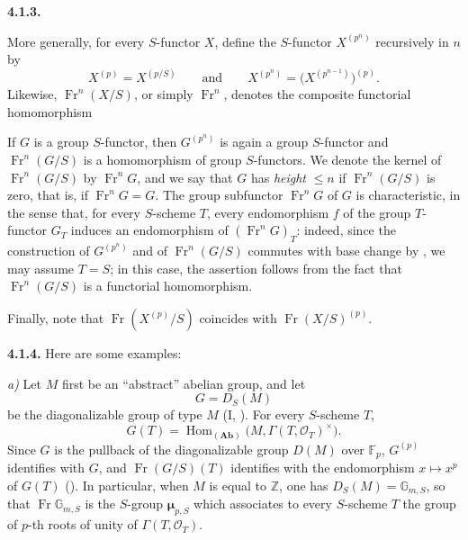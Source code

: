 
\medskip
\noindent\textbf{4.1.3.}
\label{sga3:VIIA:4.1.3}

More generally, for every \(S\)-functor \(X\), define the
\(S\)-functor \(X^{(p^n)}\) recursively in \(n\) by
\[
  X^{(p)}=X^{(p/S)}
  \qquad\text{and}\qquad
  X^{(p^n)}
  =
  \bigl(X^{(p^{n-1})}\bigr)^{(p)}.
\]
Likewise, \(\operatorname{Fr}^n(X/S)\), or simply
\(\operatorname{Fr}^n\), denotes the composite functorial
homomorphism
\begin{center}
  \label{sga3:VIIA:4.1.3-iterated-relative-frobenius-chain}
  
\end{center}
If \(G\) is a group \(S\)-functor, then \(G^{(p^n)}\) is again a group
\(S\)-functor and \(\operatorname{Fr}^n(G/S)\) is a homomorphism of
group \(S\)-functors. We denote the kernel of
\(\operatorname{Fr}^n(G/S)\) by \(\operatorname{Fr}^nG\), and we say that
\(G\) has \emph{height} \(\leq n\) if \(\operatorname{Fr}^n(G/S)\) is
zero, that is, if \(\operatorname{Fr}^nG=G\). The group subfunctor
\(\operatorname{Fr}^nG\) of \(G\) is characteristic, in the sense that,
for every \(S\)-scheme \(T\), every endomorphism \(f\) of the group
\(T\)-functor \(G_T\) induces an endomorphism of
\((\operatorname{Fr}^nG)_T\): indeed, since the construction of
\(G^{(p^n)}\) and of \(\operatorname{Fr}^n(G/S)\) commutes with base
change by , we may assume \(T=S\); in this case, the
assertion follows from the fact that \(\operatorname{Fr}^n(G/S)\) is a
functorial homomorphism.

Finally, note that \(\operatorname{Fr}(X^{(p)}/S)\) coincides with
\(\operatorname{Fr}(X/S)^{(p)}\).

\medskip
\noindent\textbf{4.1.4.}
\label{sga3:VIIA:4.1.4}
Here are some examples:

\smallskip
\noindent\textit{a)}
Let \(M\) first be an ``abstract'' abelian group, and let
\[
  G=D_S(M)
\]
be the diagonalizable group of type \(M\) (I, ). For every
\(S\)-scheme \(T\),
\[
  G(T)
  =
  \operatorname{Hom}_{(\mathbf{Ab})}
    \bigl(M,\Gamma(T,\mathcal O_T)^\times\bigr).
\]
Since \(G\) is the pullback of the diagonalizable group \(D(M)\)
over \(\mathbb F_p\), \(G^{(p)}\) identifies with \(G\), and
\(\operatorname{Fr}(G/S)(T)\) identifies with the endomorphism
\(x\mapsto x^p\) of \(G(T)\) (). In particular, when
\(M\) is equal to \(\mathbb Z\), one has \(D_S(M)=\mathbb G_{m,S}\), so
that \(\operatorname{Fr}\mathbb G_{m,S}\) is the \(S\)-group
\(\boldsymbol\mu_{p,S}\) which associates to every \(S\)-scheme \(T\) the
group of \(p\)-th roots of unity of \(\Gamma(T,\mathcal O_T)\).

